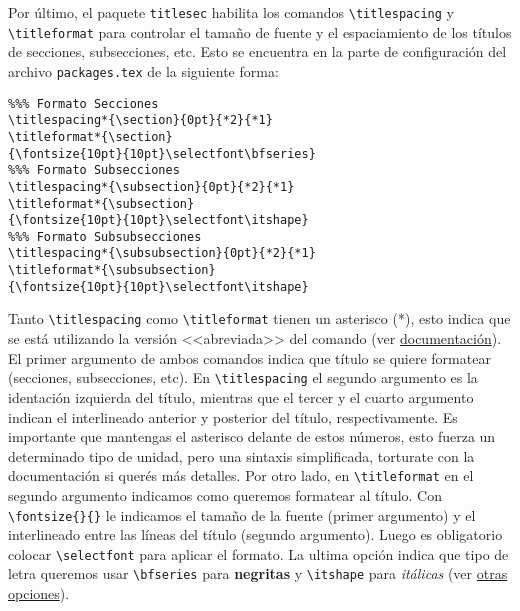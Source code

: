 \documentclass[a4paper,10pt,twocolumn,twoside]{article}
\begin{document}
Por último, el paquete \texttt{titlesec} habilita los comandos \verb+\titlespacing+ y \verb+\titleformat+ para controlar el tamaño de fuente y el espaciamiento de los títulos de secciones, subsecciones, etc. Esto se encuentra en la parte de configuración del archivo \texttt{packages.tex} de la siguiente forma:
\begin{Verbatim}[fontsize=\fontsize{8pt}{8pt}\selectfont]
%%%%% Formato de titulos
%%% Formato Secciones
\titlespacing*{\section}{0pt}{*2}{*1}
\titleformat*{\section}
{\fontsize{10pt}{10pt}\selectfont\bfseries}
%%% Formato Subsecciones
\titlespacing*{\subsection}{0pt}{*2}{*1}
\titleformat*{\subsection}
{\fontsize{10pt}{10pt}\selectfont\itshape}
%%% Formato Subsubsecciones
\titlespacing*{\subsubsection}{0pt}{*2}{*1}
\titleformat*{\subsubsection}
{\fontsize{10pt}{10pt}\selectfont\itshape}
\end{Verbatim}
Tanto \verb+\titlespacing+ como \verb+\titleformat+ tienen un asterisco (*), esto indica que se está utilizando la versión <<abreviada>> del comando (ver \href{https://ctan.dcc.uchile.cl/macros/latex/contrib/titlesec/titlesec.pdf}{documentación}). El primer argumento de ambos comandos indica que título se quiere formatear (secciones, subsecciones, etc). En \verb+\titlespacing+ el segundo argumento es la identación izquierda del título, mientras que el tercer y el cuarto argumento indican el interlineado anterior y posterior del título, respectivamente. Es importante que mantengas el asterisco delante de estos números, esto fuerza un determinado tipo de unidad, pero una sintaxis simplificada, torturate con la documentación si querés más detalles. Por otro lado, en \verb+\titleformat+ en el segundo argumento indicamos como queremos formatear al título. Con \verb+\fontsize{}{}+ le indicamos el tamaño de la fuente (primer argumento) y el interlineado entre las líneas del título (segundo argumento). Luego es obligatorio colocar \verb+\selectfont+ para aplicar el formato. La ultima opción indica que tipo de letra queremos usar \verb+\bfseries+ para \textbf{negritas} y \verb+\itshape+ para \textit{itálicas} (ver \href{https://www.overleaf.com/learn/latex/Font_sizes,_families,_and_styles}{otras opciones}).
\end{document}
